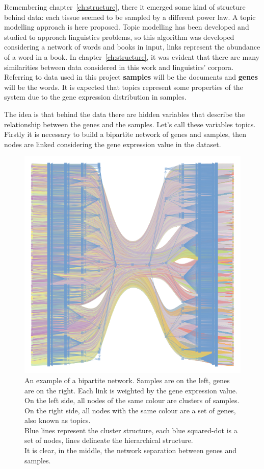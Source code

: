 Remembering chapter~\ref{ch:structure}, there it emerged some kind of structure behind data: each tissue seemed to be sampled by a different power law. A topic modelling approach is here proposed. Topic modelling has been developed and studied to approach linguistics problems, so this algorithm was developed considering a network of words and books in input, links represent the abundance of a word in a book. In chapter~\ref{ch:structure}, it was evident that there are many similarities between data considered in this work and linguistics' corpora. Referring to data used in this project \textbf{samples} will be the documents and \textbf{genes} will be the words. It is expected that topics represent some properties of the system due to the gene expression distribution in samples.

The idea is that behind the data there are hidden variables that describe the relationship between the genes and the samples. Let's call these variables topics.
Firstly it is necessary to build a bipartite network of genes and samples, then nodes are linked considering the gene expression value in the dataset.
\begin{figure}[htb!]
    \centering
    \includegraphics[width=0.7\linewidth]{pictures/topic/bipartite.pdf}
    \caption{An example of a bipartite network. Samples are on the left, genes are on the right. Each link is weighted by the gene expression value. On the left side, all nodes of the same colour are clusters of samples. On the right side, all nodes with the same colour are a set of genes, also known as topics.\\
    Blue lines represent the cluster structure, each blue squared-dot is a set of nodes, lines delineate the hierarchical structure.\\
    It is clear, in the middle, the network separation between genes and samples.}
    \label{fig:topic/bipartite}
\end{figure}

